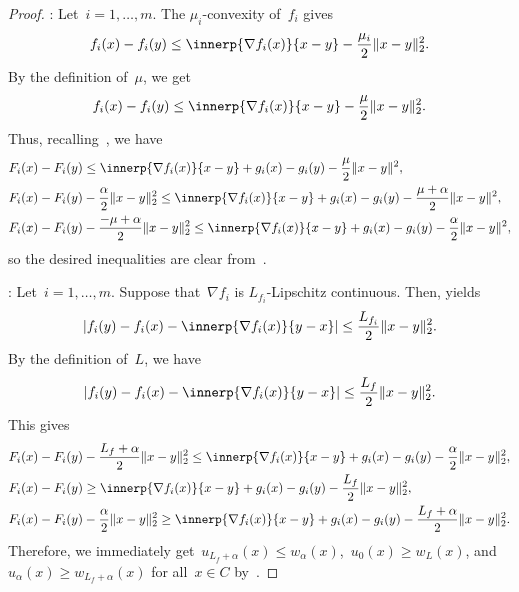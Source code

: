 \documentclass[../main]{subfiles}
\begin{document}
\begin{proof}
    :
Let~$i = 1, \dots, m$.
The $\mu_i$-convexity of~$f_i$ gives
\begin{equation}
    f_i(x) - f_i(y) \le \innerp{\nabla f_i(x)}{x - y} - \frac{\mu_i}{2} \norm{x - y}_2^2
.\end{equation}
By the definition of~$\mu$, we get
\begin{equation}
    f_i(x) - f_i(y) \le \innerp{\nabla f_i(x)}{x - y} - \frac{\mu}{2} \norm{x - y}_2^2
.\end{equation}
Thus, recalling~, we have
\begin{align}
    &F_i(x) - F_i(y) \le \innerp{\nabla f_i(x)}{x - y} + g_i(x) - g_i(y) - \frac{\mu}{2} \norm{x - y}^2, \\
    &F_i(x) - F_i(y) - \frac{\alpha}{2}\norm{x - y}_2^2 \le \innerp{\nabla f_i(x)}{x - y} + g_i(x) - g_i(y) - \frac{\mu + \alpha}{2} \norm{x - y}^2, \\
    &F_i(x) - F_i(y) - \frac{- \mu + \alpha}{2}\norm{x - y}_2^2 \le \innerp{\nabla f_i(x)}{x - y} + g_i(x) - g_i(y) - \frac{\alpha}{2} \norm{x - y}^2
,\end{align}
so the desired inequalities are clear from~.

:
Let~$i = 1, \dots, m$.
Suppose that~$\nabla f_i$ is $L_{f_i}$-Lipschitz continuous.
Then,  yields
\begin{equation}
    \abs*{f_i(y) - f_i(x) - \innerp{\nabla f_i(x)}{y - x}} \le \frac{L_{f_i}}{2}\norm{x - y}_2^2.
\end{equation}
By the definition of~$L$, we have
\begin{equation}
    \abs*{f_i(y) - f_i(x) - \innerp{\nabla f_i(x)}{y - x}} \le \frac{L_f}{2}\norm{x - y}_2^2.
\end{equation}
This gives
\begin{align}
    &F_i(x) - F_i(y) - \frac{L_f + \alpha}{2} \norm{x - y}_2^2 \le \innerp{\nabla f_i(x)}{x - y} + g_i(x) - g_i(y) - \frac{\alpha}{2} \norm{x - y}_2^2, \\
    &F_i(x) - F_i(y) \ge \innerp{\nabla f_i(x)}{x - y} + g_i(x) - g_i(y) - \frac{L_f}{2} \norm{x - y}_2^2, \\
    &F_i(x) - F_i(y) - \frac{\alpha}{2} \norm{x - y}_2^2 \ge \innerp{\nabla f_i(x)}{x - y} + g_i(x) - g_i(y) - \frac{L_f + \alpha}{2} \norm{x - y}_2^2
.\end{align}
Therefore, we immediately get~$u_{L_f + \alpha}(x) \le w_\alpha(x)$,~$u_0(x) \ge w_L(x)$, and~$u_\alpha(x) \ge w_{L_f + \alpha}(x)$ for all~$x \in C$ by~.
\end{proof}
\end{document}
